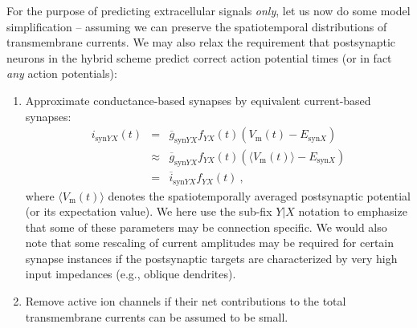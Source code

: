 For the purpose of predicting extracellular signals \emph{only}, 
let us now do some model simplification -- assuming we can preserve the spatiotemporal distributions of transmembrane currents. 
We may also relax the requirement that postsynaptic neurons in the hybrid scheme predict correct action potential times (or in fact \emph{any} action potentials):
\begin{enumerate}
\item Approximate conductance-based synapses by equivalent current-based synapses:
\begin{eqnarray}
i_{\mathrm{syn}YX}(t) 
	&=& \overline{g}_{\mathrm{syn}YX}f_{YX}(t)\left(V_\mathrm{m}(t) - E_{\mathrm{syn}X}\right) \\
	&\approx& \overline{g}_{\mathrm{syn}YX}f_{YX}(t)\left(\langle V_\mathrm{m}(t) \rangle - E_{\mathrm{syn}X}\right) \\
	&=& \overline{i}_{\mathrm{syn}YX}f_{YX}(t)~, 
\end{eqnarray}
where $\langle V_\mathrm{m}(t) \rangle$ denotes the spatiotemporally averaged postsynaptic potential (or its expectation value). 
We here use the sub-fix $Y|X$ notation to emphasize that some of these parameters may be connection specific.
We would also note that some rescaling of current amplitudes may be required for certain synapse instances if the postsynaptic targets are characterized by very high input impedances (e.g., oblique dendrites).  

\item Remove active ion channels if their net contributions to the total transmembrane currents can be assumed to be small.


\end{enumerate}
